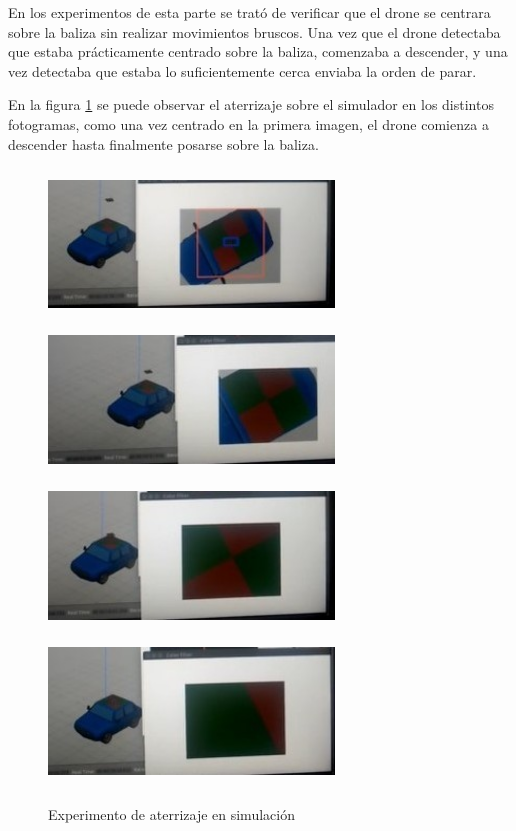 \hspace{1cm} En los experimentos de esta parte se trat\'o de verificar que el drone se centrara sobre la baliza sin realizar movimientos bruscos. Una vez que el drone detectaba que estaba pr\'acticamente centrado sobre la baliza, comenzaba a descender, y una vez detectaba que estaba lo suficientemente cerca enviaba la orden de parar.

En la figura \ref{f:Aterrizaje sobre el simulador} se puede observar el aterrizaje sobre el simulador en los distintos fotogramas, como una vez centrado en la primera imagen, el drone comienza a descender hasta finalmente posarse sobre la baliza. 

\begin{figure}[H]
 \centering
    \includegraphics[width=7.6cm,height=4cm]{imgs/landing1_1.jpg}
    \includegraphics[width=7.6cm,height=4cm]{imgs/landing2_1.jpg}
    \includegraphics[width=7.6cm,height=4cm]{imgs/landing3_1.jpg}
    \includegraphics[width=7.6cm,height=4cm]{imgs/landing4_1.jpg}
 \caption{Experimento de aterrizaje en simulaci\'on}
 \label{f:Aterrizaje sobre el simulador}
\end{figure}


